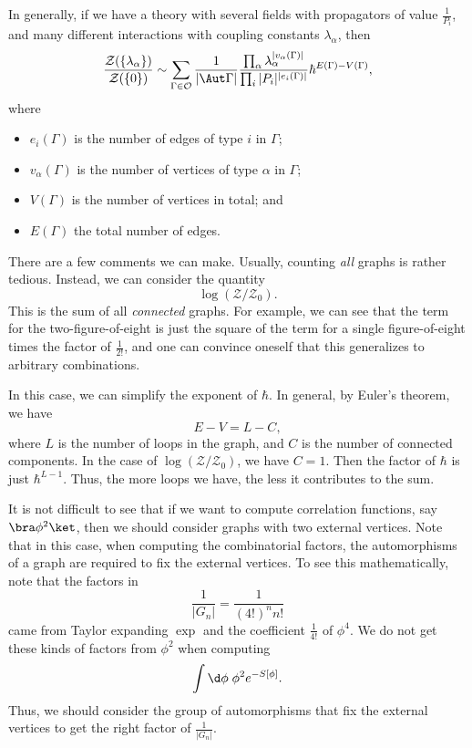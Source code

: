 \documentclass[a4paper]{article}
\begin{document}
In generally, if we have a theory with several fields with propagators of value $\frac{1}{P_i}$, and many different interactions with coupling constants $\lambda_\alpha$, then
\[
  \frac{\mathcal{Z}(\{\lambda_\alpha\})}{ \mathcal{Z}(\{0\})} \sim \sum_{\Gamma \in \mathcal{O}} \frac{1}{|\Aut \Gamma|} \frac{\prod_\alpha \lambda_\alpha^{|v_\alpha(\Gamma)|}}{\prod_i |P_i|^{|e_i(\Gamma)|}} \hbar^{E(\Gamma) - V(\Gamma)},
\]
where
\begin{itemize}
  \item $e_i(\Gamma)$ is the number of edges of type $i$ in $\Gamma$;
  \item $v_\alpha(\Gamma)$ is the number of vertices of type $\alpha$ in $\Gamma$;
  \item $V(\Gamma)$ is the number of vertices in total; and
  \item $E(\Gamma)$ the total number of edges.
\end{itemize}
There are a few comments we can make. Usually, counting \emph{all} graphs is rather tedious. Instead, we can consider the quantity
\[
  \log (\mathcal{Z}/\mathcal{Z}_0).
\]
This is the sum of all \emph{connected} graphs. For example, we can see that the term for the two-figure-of-eight is just the square of the term for a single figure-of-eight times the factor of $\frac{1}{2!}$, and one can convince oneself that this generalizes to arbitrary combinations.

In this case, we can simplify the exponent of $\hbar$. In general, by Euler's theorem, we have
\[
  E - V = L - C,
\]
where $L$ is the number of loops in the graph, and $C$ is the number of connected components. In the case of $\log (\mathcal{Z}/\mathcal{Z}_0)$, we have $C = 1$. Then the factor of $\hbar$ is just $\hbar^{L - 1}$. Thus, the more loops we have, the less it contributes to the sum.

It is not difficult to see that if we want to compute correlation functions, say $\bra \phi^2\ket$, then we should consider graphs with two external vertices. Note that in this case, when computing the combinatorial factors, the automorphisms of a graph are required to fix the external vertices. To see this mathematically, note that the factors in
\[
  \frac{1}{|G_n|} = \frac{1}{(4!)^n n!}
\]
came from Taylor expanding $\exp$ and the coefficient $\frac{1}{4!}$ of $\phi^4$. We do not get these kinds of factors from $\phi^2$ when computing
\[
  \int \d \phi\; \phi^2 e^{-S[\phi]}.
\]
Thus, we should consider the group of automorphisms that fix the external vertices to get the right factor of $\frac{1}{|G_n|}$.
\end{document}
